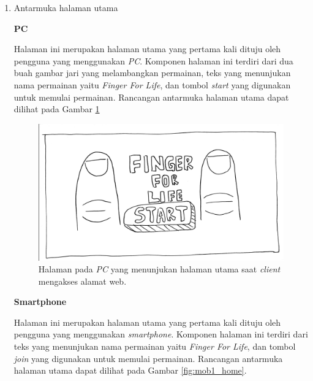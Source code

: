 \begin{enumerate}
	\item Antarmuka halaman utama
	
	\textbf{PC}
	
	Halaman ini merupakan halaman utama yang pertama kali dituju oleh pengguna yang menggunakan \textit{PC}. Komponen halaman ini terdiri dari dua buah gambar jari yang melambangkan permainan, teks yang menunjukan nama permainan yaitu \textit{Finger For Life}, dan tombol \textit{start} yang digunakan untuk memulai permainan. Rancangan antarmuka halaman utama dapat dilihat pada Gambar \ref{fig:web1_home}

\begin{figure}[H]
	\centering
	\includegraphics[scale=0.1]{Gambar/web1_home}
	\caption{Halaman pada \textit{PC} yang menunjukan halaman utama saat \textit{client} mengakses alamat web.}
	\label{fig:web1_home}
\end{figure}

	\textbf{Smartphone}
	
	Halaman ini merupakan halaman utama yang pertama kali dituju oleh pengguna yang menggunakan \textit{smartphone}. Komponen halaman ini terdiri dari teks yang menunjukan nama permainan yaitu \textit{Finger For Life}, dan tombol \textit{join} yang digunakan untuk memulai permainan. Rancangan antarmuka halaman utama dapat dilihat pada Gambar \ref{fig:mob1_home}.
	

\end{enumerate}
